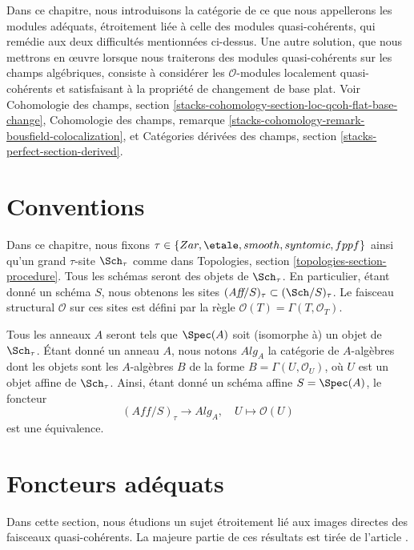 \medskip\noindent
Dans ce chapitre, nous introduisons la catégorie de ce que nous appellerons
les modules adéquats, étroitement liée à celle des modules quasi-cohérents,
qui remédie aux deux difficultés mentionnées ci-dessus. Une autre solution,
que nous mettrons en œuvre lorsque nous traiterons des modules quasi-cohérents
sur les champs algébriques, consiste à considérer les $\mathcal{O}$-modules
localement quasi-cohérents et satisfaisant à la propriété de changement de base plat.
Voir Cohomologie des champs, section
\ref{stacks-cohomology-section-loc-qcoh-flat-base-change},
Cohomologie des champs, remarque
\ref{stacks-cohomology-remark-bousfield-colocalization}, et
Catégories dérivées des champs, section
\ref{stacks-perfect-section-derived}.






\section{Conventions}
\label{section-conventions}

\noindent
Dans ce chapitre, nous fixons
$\tau \in \{Zar, \etale, smooth, syntomic, fppf\}$
ainsi qu'un grand $\tau$-site $\Sch_\tau$ comme dans
Topologies, section \ref{topologies-section-procedure}.
Tous les schémas seront des objets de $\Sch_\tau$.
En particulier, étant donné un schéma $S$, nous obtenons les sites
$(\textit{Aff}/S)_\tau \subset (\Sch/S)_\tau$.
Le faisceau structural $\mathcal{O}$ sur ces sites est défini par
la règle $\mathcal{O}(T) = \Gamma(T, \mathcal{O}_T)$.

\medskip\noindent
Tous les anneaux $A$ seront tels que $\Spec(A)$ soit (isomorphe à) un
objet de $\Sch_\tau$. Étant donné un anneau $A$, nous notons
$\textit{Alg}_A$ la catégorie de $A$-algèbres dont les objets sont les
$A$-algèbres $B$ de la forme $B = \Gamma(U, \mathcal{O}_U)$,
où $U$ est un objet affine de $\Sch_\tau$. Ainsi, étant donné un
schéma affine $S = \Spec(A)$, le foncteur
$$
(\textit{Aff}/S)_\tau \longrightarrow \textit{Alg}_A,
\quad
U \longmapsto \mathcal{O}(U)
$$
est une équivalence.





\section{Foncteurs adéquats}
\label{section-quasi-coherent}

\noindent
Dans cette section, nous étudions un sujet étroitement lié aux
images directes des faisceaux quasi-cohérents. La majeure partie de ces
résultats est tirée de l'article \cite{Jaffe}.

